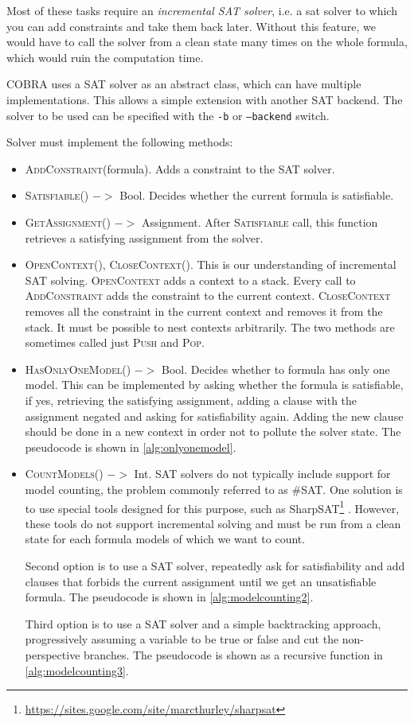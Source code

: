Most of these tasks require an \emph{incremental SAT solver}, i.e. a
  sat solver to which you can add constraints and take them back later.
Without this feature, we would have to call the solver from a clean state
  many times on the whole formula, which would ruin the computation time.

COBRA uses a SAT solver as an abstract class, which can have multiple implementations.
This allows a simple extension with another SAT backend.
The solver to be used can be specified with
  the \texttt{-b} or \texttt{--backend} switch.

Solver must implement the following methods:
\begin{itemize}
\item \textsc{AddConstraint}(formula). Adds a constraint to the SAT solver.
\item \textsc{Satisfiable()} $->$ Bool. Decides whether the current formula is satisfiable.
\item \textsc{GetAssignment()} $->$ Assignment.
  After \textsc{Satisfiable} call, this function retrieves
  a satisfying assignment from the solver.
\item \textsc{OpenContext(), CloseContext()}.
  This is our understanding of incremental SAT solving.
  \textsc{OpenContext} adds a context to a stack.
  Every call to \textsc{AddConstraint} adds the constraint to the current context.
  \textsc{CloseContext} removes all the constraint in the current context and removes it
  from the stack. It must be possible to nest contexts arbitrarily.
  The two methods are sometimes called just \textsc{Push} and \textsc{Pop}.
\item \textsc{HasOnlyOneModel()} $->$ Bool. Decides whether to formula has only one model.
  This can be implemented by asking whether the formula is satisfiable,
  if yes, retrieving the satisfying assignment, adding
  a clause with the assignment negated and asking for satisfiability again.
  Adding the new clause should be done in a new context in order not to pollute
  the solver state. The pseudocode is shown in \autoref{alg:onlyonemodel}.

\item \textsc{CountModels()} $->$ Int.
SAT solvers do not typically include support for model counting, the problem
  commonly referred to as \#SAT.
One solution is to use
  special tools designed for this purpose,
  such as SharpSAT\footnote{\url{https://sites.google.com/site/marcthurley/sharpsat}}
  \cite{sharpsat}.
However, these tools do not support incremental solving and
  must be run from a clean state for each formula models of which we want to count.

Second option is to use a SAT solver, repeatedly ask for satisfiability and
  add clauses that forbids the current assignment until we get
  an unsatisfiable formula. The pseudocode is shown in \autoref{alg:modelcounting2}.

Third option is to use a SAT solver and a simple backtracking approach,
  progressively assuming a variable to be true or false and cut the non-perspective
  branches.
The pseudocode is shown as a recursive function in \autoref{alg:modelcounting3}.
\end{itemize}

